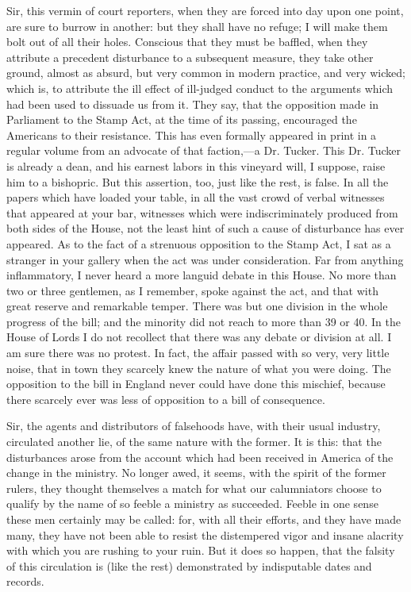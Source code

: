 Sir, this vermin of court reporters, when they are forced into day upon one point, are sure to burrow in another: but they shall have no refuge; I will make them bolt out of all their holes. Conscious that they must be baffled, when they attribute a precedent disturbance to a subsequent measure, they take other ground, almost as absurd, but very common in modern practice, and very wicked; which is, to attribute the ill effect of ill-judged conduct to the arguments which had been used to dissuade us from it. They say, that the opposition made in Parliament to the Stamp Act, at the time of its passing, encouraged the Americans to their resistance. This has even formally appeared in print in a regular volume from an advocate of that faction,—a Dr. Tucker. This Dr. Tucker is already a dean, and his earnest labors in this vineyard will, I suppose, raise him to a bishopric. But this assertion, too, just like the rest, is false. In all the papers which have loaded your table, in all the vast crowd of verbal witnesses that appeared at your bar, witnesses which were indiscriminately produced from both sides of the House, not the least hint of such a cause of disturbance has ever appeared. As to the fact of a strenuous opposition to the Stamp Act, I sat as a stranger in your gallery when the act was under consideration. Far from anything inflammatory, I never heard a more languid debate in this House. No more than two or three gentlemen, as I remember, spoke against the act, and that with great reserve and remarkable temper. There was but one division in the whole progress of the bill; and the minority did not reach to more than 39 or 40. In the House of Lords I do not recollect that there was any debate or division at all. I am sure there was no protest. In fact, the affair passed with so very, very little noise, that in town they scarcely knew the nature of what you were doing. The opposition to the bill in England never could have done this mischief, because there scarcely ever was less of opposition to a bill of consequence.

Sir, the agents and distributors of falsehoods have, with their usual industry, circulated another lie, of the same nature with the former. It is this: that the disturbances arose from the account which had been received in America of the change in the ministry. No longer awed, it seems, with the spirit of the former rulers, they thought themselves a match for what our calumniators choose to qualify by the name of so feeble a ministry as succeeded. Feeble in one sense these men certainly may be called: for, with all their efforts, and they have made many, they have not been able to resist the distempered vigor and insane alacrity with which you are rushing to your ruin. But it does so happen, that the falsity of this circulation is (like the rest) demonstrated by indisputable dates and records.

